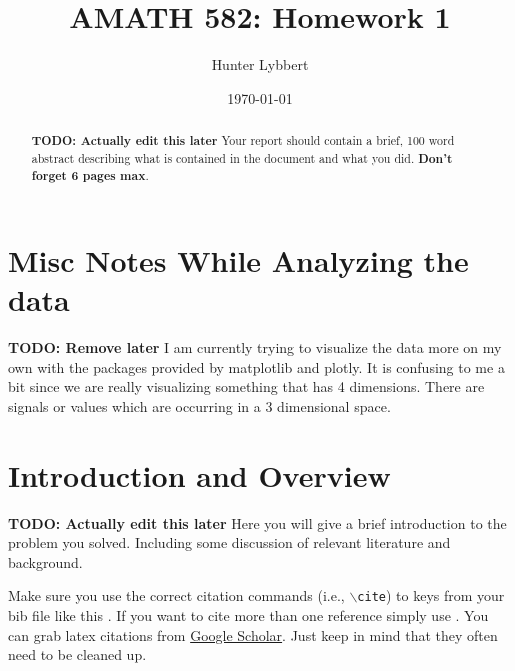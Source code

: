 \documentclass[11pt]{amsart}
\title{AMATH 582: Homework 1}
\author{Hunter Lybbert} %
\date{\today} %
\begin{document}
\maketitle

\begin{abstract}
\textbf{TODO: Actually edit this later}
    Your report should contain a brief, 100 word abstract describing what is contained in 
    the document and what you did. {\bf Don't forget 6 pages max}.
\end{abstract}

\section{Misc Notes While Analyzing the data}\label{sec:Notes}
\textbf{TODO: Remove later}
I am currently trying to visualize the data more on my own with the packages provided by matplotlib and plotly.
It is confusing to me a bit since we are really visualizing something that has 4 dimensions. There are signals or values which are occurring in a 3 dimensional space.




\section{Introduction and Overview}\label{sec:Introduction}
\textbf{TODO: Actually edit this later}
Here you will give a brief introduction to the problem you solved. Including 
some discussion of relevant literature and background. 

Make sure you use the correct citation commands (i.e., \texttt{$\backslash$cite}) to keys 
from your bib file like this \cite{example-article-citation}. If you want 
to cite more than one reference simply use \cite{example-article-citation, example-book-citation}. You can grab latex citations 
from \href{https://scholar.google.com}{Google Scholar}. Just keep in mind that they often 
need to be cleaned up.
\end{document}
